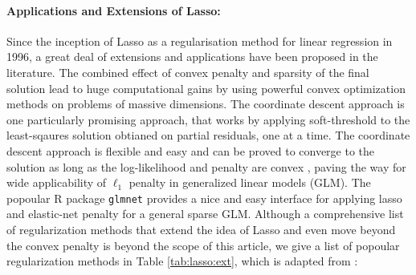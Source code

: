 \documentclass[11pt]{article}
\numberwithin{equation}{section}
\begin{document}
\paragraph{Applications and Extensions of Lasso:} Since the inception of Lasso as a regularisation method for linear regression in 1996, a great deal of extensions and applications have been proposed in the literature. The combined effect of convex penalty and sparsity of the final solution lead to huge computational gains by using powerful convex optimization methods on problems of massive dimensions. The coordinate descent approach \citep{friedman2007pathwise,friedman2010regularization} is one particularly promising approach, that works by applying soft-threshold to the least-sqaures solution obtianed on partial residuals, one at a time. The coordinate descent approach is flexible and easy and can be proved to converge to the solution as long as the log-likelihood and penalty are convex \citep{tseng2001convergence}, paving the way for wide applicability of $\ell_1$ penalty in generalized linear models (GLM). The popoular R package \texttt{glmnet} provides a nice and easy interface for applying lasso and elastic-net penalty for a general sparse GLM. Although a comprehensive list of regularization methods that extend the idea of Lasso and even move beyond the convex penalty is beyond the scope of this article, we give a list of popoular regularization methods in Table \ref{tab:lasso:ext}, which is adapted from \citet{tibshirani2014praise}:
\end{document}
